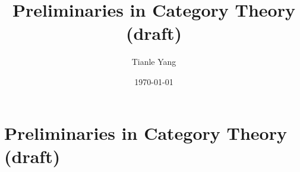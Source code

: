 \documentclass{noteformyself}
\title{Preliminaries in Category Theory (draft)}
\author{Tianle Yang}
\date{\today}
\begin{document}
    \maketitle

    \section{Preliminaries in Category Theory (draft)}



\end{document}
